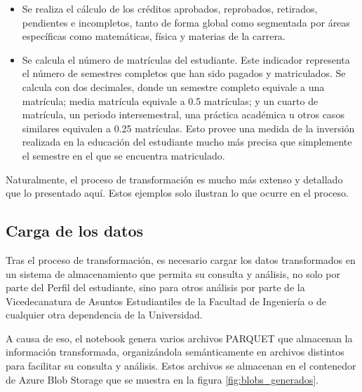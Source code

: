 \begin{itemize}
\begin{itemize}
		      \item Se realiza el cálculo de los créditos aprobados, reprobados, retirados, pendientes e incompletos, tanto de forma global como segmentada por áreas específicas como matemáticas, física y materias de la carrera.
		      \item Se calcula el número de matrículas del estudiante. Este indicador representa el número de semestres completos que han sido pagados y matriculados. Se calcula con dos decimales, donde un semestre completo equivale a una matrícula; media matrícula equivale a 0.5 matrículas; y un cuarto de matrícula, un periodo intersemestral, una práctica académica u otros casos similares equivalen a 0.25 matrículas. Esto provee una medida de la inversión realizada en la educación del estudiante mucho más precisa que simplemente el semestre en el que se encuentra matriculado.
	      \end{itemize}
\end{itemize}

Naturalmente, el proceso de transformación es mucho más extenso y detallado que lo presentado aquí. Estos ejemplos solo ilustran lo que ocurre en el proceso.

\subsection{Carga de los datos}

Tras el proceso de transformación, es necesario cargar los datos transformados en un sistema de almacenamiento que permita su consulta y análisis, no solo por parte del Perfil del estudiante, sino para otros análisis por parte de la Vicedecanatura de Asuntos Estudiantiles de la Facultad de Ingeniería o de cualquier otra dependencia de la Universidad.

A causa de eso, el notebook genera varios archivos PARQUET que almacenan la información transformada, organizándola semánticamente en archivos distintos para facilitar su consulta y análisis. Estos archivos se almacenan en el contenedor de Azure Blob Storage que se muestra en la figura \ref{fig:blobs_generados}.

